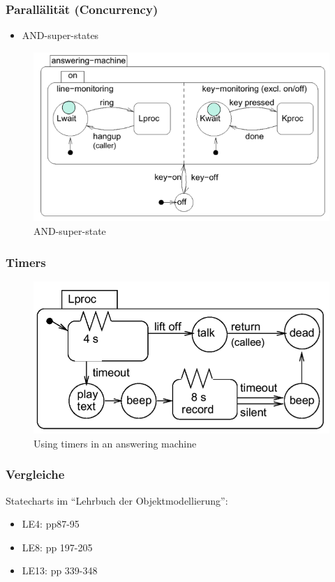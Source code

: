 \subsubsection{Parallälität (Concurrency)}
\begin{itemize}
  \item AND-super-states
\end{itemize}

\begin{figure}[htbp]
  \centering
  {\includegraphics[scale = 0.4]{images/FSM/AND_super_state}  
  \caption{AND-super-state}
  \label{fig:AND_super_state}}
\end{figure} 

\subsubsection{Timers}
\begin{figure}[htbp]
  \centering
  {\includegraphics[scale = 0.4]{images/FSM/timer}  
  \caption{Using timers in an  answering machine}
  \label{fig:timer}}
\end{figure} 

\subsubsection{Vergleiche }
Statecharts im "`Lehrbuch der Objektmodellierung"':
\begin{itemize}
  \item LE4: pp87-95
  \item LE8: pp 197-205
  \item LE13: pp 339-348
\end{itemize}


